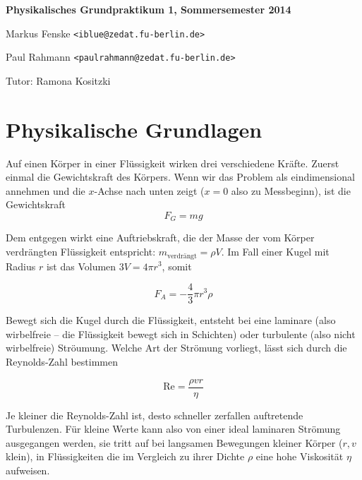 \documentclass[a4paper,german,12pt,smallheadings]{scrartcl}
\begin{document}
\allowdisplaybreaks %
\begin{center}
\bfseries %
\sffamily %
\vspace{-40pt}
Physikalisches Grundpraktikum 1, Sommersemester 2014

Markus Fenske \texttt{<iblue@zedat.fu-berlin.de>}

Paul Rahmann \texttt{<paulrahmann@zedat.fu-berlin.de>}

Tutor: Ramona Kositzki
\vspace{-10pt}
\end{center}

\section*{Physikalische Grundlagen}

Auf einen Körper in einer Flüssigkeit wirken drei verschiedene Kräfte. Zuerst
einmal die Gewichtskraft des Körpers. Wenn wir das Problem als eindimensional
annehmen und die $x$-Achse nach unten zeigt ($x = 0$ also zu Messbeginn), ist
die Gewichtskraft
\begin{equation}
  F_G = mg
\end{equation}

Dem entgegen wirkt eine Auftriebskraft, die der Masse der vom Körper verdrängten
Flüssigkeit entspricht: $m_\text{verdrängt} = \rho V$. Im Fall einer Kugel mit
Radius $r$ ist das Volumen $3V = 4 \pi r^3$, somit

\begin{equation}
  F_A = -\frac{4}{3} \pi r^3 \rho
\end{equation}

Bewegt sich die Kugel durch die Flüssigkeit, entsteht bei eine laminare (also
wirbelfreie -- die Flüssigkeit bewegt sich in Schichten) oder turbulente (also
nicht wirbelfreie) Ströumung. Welche Art der Strömung vorliegt, lässt sich
durch die Reynolds-Zahl bestimmen

\begin{equation}
  \text{Re} = \frac{\rho v r}{\eta}
\end{equation}

Je kleiner die Reynolds-Zahl ist, desto schneller zerfallen auftretende
Turbulenzen. Für kleine Werte kann also von einer ideal laminaren Strömung
ausgegangen werden, sie tritt auf bei langsamen Bewegungen kleiner Körper
($r,v$ klein), in Flüssigkeiten die im Vergleich zu ihrer Dichte $\rho$ eine
hohe Viskosität $\eta$ aufweisen.
\end{document}
